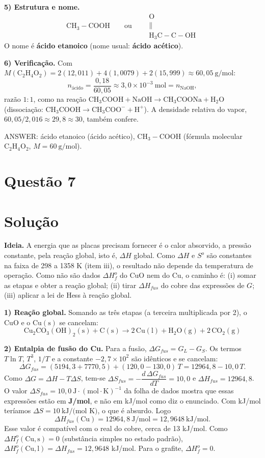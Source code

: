 \documentclass{article}%
\begin{document}
\textbf{5) Estrutura e nome.}
\[
\mathrm{CH_3{-}COOH}\qquad\text{ou}\qquad
\begin{array}{c}
\mathrm{O}\\[-2pt]
\|\\[-2pt]
\mathrm{H_3C{-}C{-}OH}
\end{array}
\]
O nome é \textbf{ácido etanoico} (nome usual: \textbf{ácido acético}).

\textbf{6) Verificação.} Com $M(\mathrm{C_2H_4O_2}) = 2(12{,}011)+4(1{,}0079)+2(15{,}999)\approx 60{,}05\ \mathrm{g/mol}$:
\[
n_{\text{ácido}}=\frac{0{,}18}{60{,}05}\approx 3{,}0\times10^{-3}\ \mathrm{mol}=n_{\mathrm{NaOH}},
\]
razão $1:1$, como na reação $\mathrm{CH_3COOH + NaOH \longrightarrow CH_3COONa + H_2O}$ (dissociação: $\mathrm{CH_3COOH \to CH_3COO^- + H^+}$). A densidade relativa do vapor, $60{,}05/2{,}016\approx 29{,}8\approx 30$, também confere.

\medskip
\noindent ANSWER: ácido etanoico (ácido acético), $\mathrm{CH_3{-}COOH}$ (fórmula molecular $\mathrm{C_2H_4O_2}$, $M=60\ \mathrm{g/mol}$).%
\newpage%
\section*{Questão 7}

\section*{Solução}

\textbf{Ideia.} A energia que as placas precisam fornecer é o calor absorvido, a pressão constante, pela reação global, isto é, $\Delta H$ global. Como $\Delta H$ e $S^o$ são constantes na faixa de 298 a 1358 K (item iii), o resultado não depende da temperatura de operação. Como não são dados $\Delta H_f^o$ do CuO nem do Cu, o caminho é: (i) somar as etapas e obter a reação global; (ii) tirar $\Delta H_{fus}$ do cobre das expressões de $G$; (iii) aplicar a lei de Hess à reação global.

\textbf{1) Reação global.} Somando as três etapas (a terceira multiplicada por 2), o CuO e o $\mathrm{Cu(s)}$ se cancelam:
\[
\mathrm{Cu_2CO_3(OH)_2(s) + C(s) \longrightarrow 2\,Cu(l) + H_2O(g) + 2\,CO_2(g)}
\]

\textbf{2) Entalpia de fusão do Cu.} Para a fusão, $\Delta G_{fus}=G_L-G_S$. Os termos $T\ln T$, $T^3$, $1/T$ e a constante $-2{,}7\times10^{2}$ são idênticos e se cancelam:
\[
\Delta G_{fus}=(5194{,}3+7770{,}5)+(120{,}0-130{,}0)\,T=12964{,}8-10{,}0\,T .
\]
Como $\Delta G=\Delta H-T\Delta S$, tem-se $\Delta S_{fus}=-\dfrac{d\,\Delta G_{fus}}{dT}=10{,}0$ e $\Delta H_{fus}=12964{,}8$. O valor $\Delta S_{fus}=10{,}0\ \text{J}\cdot(\text{mol}\cdot\text{K})^{-1}$ da folha de dados mostra que essas expressões estão em \textbf{J/mol}, e não em kJ/mol como diz o enunciado. Com kJ/mol teríamos $\Delta S=10\ \text{kJ/(mol K)}$, o que é absurdo. Logo
\[
\Delta H_{fus}(\mathrm{Cu})=12964{,}8\ \text{J/mol}=12{,}9648\ \text{kJ/mol}.
\]
Esse valor é compatível com o real do cobre, cerca de 13 kJ/mol. Como $\Delta H_f^o(\mathrm{Cu,s})=0$ (substância simples no estado padrão), $\Delta H_f^o(\mathrm{Cu,l})=\Delta H_{fus}=12{,}9648$ kJ/mol. Para o grafite, $\Delta H_f^o=0$.
\end{document}
